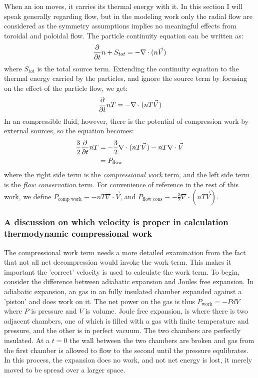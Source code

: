 \begin{refsection}
When an ion moves, it carries its thermal energy with it. In this section I will speak generally regarding flow, but in the modeling work only the radial flow are considered as the symmetry assumptions implies no meaningful effects from toroidal and poloidal flow. The particle continuity equation can be written as:
\begin{align}
    \frac{\partial}{\partial t} n + S_{tot} = -\nabla\cdot(n\vec{V})
\end{align}
where $S_{tot}$ is the total source term. Extending the continuity equation to the thermal energy carried by the particles, and ignore the source term by focusing on the effect of the particle flow, we get:
\begin{align}\label{eqn:thermal_continuity}
    \frac{\partial}{\partial t} nT = -\nabla\cdot(nT\vec{V})
\end{align}
In an compressible fluid, however, there is the potential of compression work by external sources, so the equation becomes:
\begin{align}
    \frac{3}{2}\frac{\partial}{\partial t} nT &= -\frac{3}{2}\nabla\cdot(nT\vec{V}) - nT\nabla\cdot\vec{V}\\
    &= P_{\text{flow}}\nonumber
\end{align}
where the right side term is the \emph{compressional work} term, and the left side term is the \emph{flow conservation} term. For convenience of reference in the rest of this work, we define $P_{\text{comp work}} \equiv - nT\nabla\cdot\vec{V} $, and $P_{\text{flow cons}} \equiv -\frac{3}{2}\nabla\cdot(nT\vec{V})$.


\subsubsection{A discussion on which velocity is proper in calculation thermodynamic compressional work}

The compressional work term needs a more detailed examination from the fact that not all net decompression would invoke the work term. This makes it important the 'correct' velocity is used to calculate the work term. To begin, consider the difference between adiabatic expansion and Joules free expansion. In adiabatic expansion, an gas in an fully insulated chamber expanded against a 'piston' and does work on it. The net power on the gas is thus $P_{\text{work}} = - PdV$ where $P$ is pressure and $V$ is volume. Joule free expansion, is where there is two adjacent chambers, one of which is filled with a gas with finite temperature and pressure, and the other is in perfect vacuum. The two chambers are perfectly insulated. At a $t=0$ the wall between the two chambers are broken and gas from the first chamber is allowed to flow to the second until the pressure equlibrates. In this process, the expansion does no work, and not net energy is lost, it merely moved to be spread over a larger space. 


\end{refsection}

